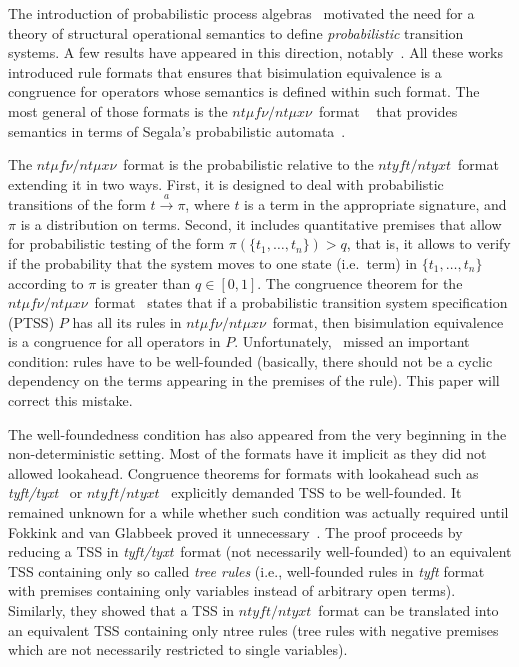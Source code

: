 \documentclass[submission,copyright,creativecommons]{eptcs}
\newcommand{\trans}[1][]{\xrightarrow{\, {#1} \, }}
\newcommand{\ntmufnu}{\ensuremath{\textit{nt}\mu\textit{f}\nu}}
\newcommand{\ntmuxnu}{\ensuremath{\textit{nt}\mu\textit{x}\nu}}
\newcommand{\ntmufxnu}{\ensuremath{\ntmufnu\textit{/}\ntmuxnu}}
\newcommand{\ntyft}{\ensuremath{\textit{ntyft}}}
\newcommand{\ntyxt}{\ensuremath{\textit{ntyxt}}}
\newcommand{\ntyfxt}{\ensuremath{\ntyft\textit{/}\ntyxt}}
\begin{document}
The introduction of probabilistic process
algebras~\cite[etc.]{DBLP:journals/iandc/BaetenBS95,DBLP:journals/iandc/GlabbeekSS95}
motivated the need for a theory of structural operational semantics to
define \emph{probabilistic} transition systems.
A few results have appeared in this direction,
notably~\cite{DBLP:journals/entcs/Bartels02,Bartels2004,DBLP:journals/tocl/LanotteT09,klin2008structural,DL-fossacs12}.
All these works introduced rule formats that ensures that bisimulation
equivalence is a congruence for operators whose semantics is defined
within such format.
The most general of those formats is the \ntmufxnu\ format ~\cite{DL-fossacs12} that provides semantics in terms of Segala's probabilistic automata~\cite{Segala95}.

\pagebreak[4]

The \ntmufxnu\ format is the probabilistic relative to the
\ntyfxt\ format~\cite{Groote93} extending it in two ways.  First,
it is designed to deal with probabilistic transitions of the form
$t\trans[a]\pi$, where $t$ is a term in the appropriate signature, and
$\pi$ is a distribution on terms. Second, it includes quantitative
premises that allow for probabilistic testing of the form
$\pi(\{t_1,\ldots,t_n\})> q$, that is, it allows to verify if the
probability that the system moves to one state (i.e.\ term) in
$\{t_1,\ldots,t_n\}$ according to $\pi$ is greater than $q\in[0,1]$.
The congruence theorem for the
\ntmufxnu\ format~\cite[Thm.~12]{DL-fossacs12} states that if a
probabilistic transition system specification (PTSS) $P$ has all its
rules in \ntmufxnu\ format, then bisimulation equivalence is a
congruence for all operators in $P$.
Unfortunately, \cite{DL-fossacs12}~missed an important condition:
rules have to be well-founded (basically, there should not be a cyclic
dependency on the terms appearing in the premises of the rule).
This paper will correct this mistake.

The well-foundedness condition has also appeared from the very beginning
in the non-deterministic setting.  Most of the formats have it
implicit as they did not allowed lookahead.  Congruence theorems for
formats with lookahead such as
\textit{tyft/tyxt}~\cite{GrooteVaandrager92} or
\ntyfxt~\cite{Groote93} explicitly demanded TSS to be well-founded.
It remained unknown for a while whether such condition was actually
required until Fokkink and van Glabbeek proved it
unnecessary~\cite{FokkinkvanGlabbeek96}.
The proof proceeds by reducing a TSS in \textit{tyft/tyxt}~format (not
necessarily well-founded) to an equivalent TSS containing only so
called \emph{tree rules} (i.e., well-founded rules in \textit{tyft}
format with premises containing only variables instead of
arbitrary open terms).  Similarly, they showed that a TSS in
\ntyfxt\ format can be translated into an equivalent TSS containing
only ntree rules (tree rules with negative premises which are not
necessarily restricted to single variables).
\end{document}
